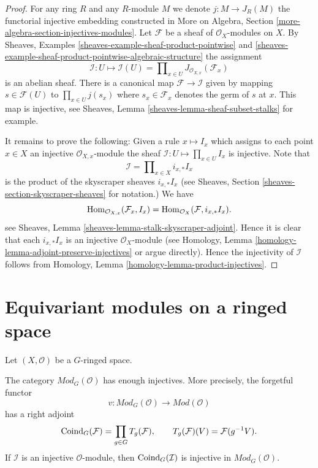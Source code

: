 \begin{proof}
For any ring $R$ and any $R$-module $M$ we denote
$j : M \to J_R(M)$ the functorial
injective embedding constructed in
More on Algebra, Section \ref{more-algebra-section-injectives-modules}.
Let $\mathcal{F}$ be a sheaf of $\mathcal{O}_X$-modules on $X$.
By Sheaves, Examples \ref{sheaves-example-sheaf-product-pointwise}
and \ref{sheaves-example-sheaf-product-pointwise-algebraic-structure}
the assignment
$$
\mathcal{I} : U \mapsto
\mathcal{I}(U) = \prod\nolimits_{x\in U} J_{\mathcal{O}_{X, x}}(\mathcal{F}_x)
$$
is an abelian sheaf.
There is a canonical map $\mathcal{F} \to \mathcal{I}$
given by mapping $s \in \mathcal{F}(U)$ to $\prod_{x \in U} j(s_x)$
where $s_x \in \mathcal{F}_x$ denotes the germ of $s$ at $x$.
This map is injective, see
Sheaves, Lemma \ref{sheaves-lemma-sheaf-subset-stalks}
for example.

\medskip\noindent
It remains to prove the following: Given a rule
$x \mapsto I_x$ which assigns to each point $x \in X$ an injective
$\mathcal{O}_{X, x}$-module
the sheaf $\mathcal{I} : U \mapsto \prod_{x \in U} I_x$
is injective. Note that
$$
\mathcal{I} = \prod\nolimits_{x \in X} i_{x, *}I_x
$$
is the product of the skyscraper sheaves $i_{x, *}I_x$ (see
Sheaves, Section \ref{sheaves-section-skyscraper-sheaves} for notation.)
We have
$$
\mathop{\mathrm{Hom}}\nolimits_{\mathcal{O}_{X, x}}(\mathcal{F}_x, I_x)
=
\mathop{\mathrm{Hom}}\nolimits_{\mathcal{O}_X}(\mathcal{F}, i_{x, *}I_x).
$$
see Sheaves, Lemma \ref{sheaves-lemma-stalk-skyscraper-adjoint}. Hence it is
clear that each $i_{x, *}I_x$ is an injective $\mathcal{O}_X$-module
(see Homology, Lemma \ref{homology-lemma-adjoint-preserve-injectives} or argue
directly). Hence the injectivity of $\mathcal{I}$ follows from
Homology, Lemma \ref{homology-lemma-product-injectives}.
\end{proof}

\section{Equivariant modules on a ringed space}
\label{section-equivariant-modules-space}

\noindent
Let $(X, \mathcal{O})$ be a $G$-ringed space.

\begin{lemma}
\label{lemma-equivariant-modules-enough-injectives}
\begin{reference}
\cite[Chapter V, \S 5.1, pp. 196--197]{Tohoku}
\end{reference}
The category $\textit{Mod}_G(\mathcal{O})$ has enough injectives.
More precisely, the forgetful functor
$$
v :
\textit{Mod}_G(\mathcal{O})
\longrightarrow
\textit{Mod}(\mathcal{O})
$$
has a right adjoint
$$
\mathop{\rm Coind}\nolimits_G(\mathcal{F})
=
\prod_{g \in G} T_g(\mathcal{F}),
\qquad
T_g(\mathcal{F})(V)=\mathcal{F}(g^{-1}V).
$$
If $\mathcal{I}$ is an injective $\mathcal{O}$-module, then
$\mathop{\rm Coind}\nolimits_G(\mathcal{I})$ is injective in
$\textit{Mod}_G(\mathcal{O})$.
\end{lemma}


